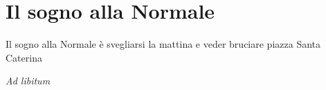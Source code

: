 \section{Il sogno alla Normale}
\begin{canzone}
Il sogno alla Normale è svegliarsi la mattina
e veder bruciare piazza Santa Caterina
\begin{flushright} \textit{\small Ad libitum}
\end{flushright}
\end{canzone}
